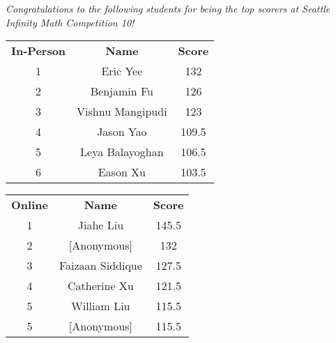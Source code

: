 \documentclass{article}
\date{\hspace{30mm}}
\begin{document}
\maketitle
\begin{minipage}[t]{.45\textwidth}\thispagestyle{empty}
  \vspace{-11mm}
  \tableofcontents
\end{minipage}%
\begin{minipage}[t]{.1\textwidth}\thispagestyle{empty}
  \;
\end{minipage}%
\begin{minipage}[t]{.45\textwidth}\thispagestyle{empty}
  \footnotesize
  \setlength{\parskip}{5pt}
  \vspace{-7mm}
  {\itshape
  Congratulations to the following students for being the top scorers at Seattle Infinity Math Competition 10!
    \begin{center}
        \begin{tabular}{c c c}
        \hline
           \textbf{In-Person}   & \textbf{Name} & \textbf{Score} \\
           1 & Eric Yee & 132  \\
           2 & Benjamin Fu & 126 \\
           3 & Vishnu Mangipudi & 123 \\
           4 & Jason Yao & 109.5 \\
           5 & Leya Balayoghan & 106.5 \\
           6 & Eason Xu & 103.5 \\
           \hline
        \end{tabular}
    \end{center}
    
    \begin{center}
        \begin{tabular}{c c c}
        \hline
          \textbf{Online}    & \textbf{Name} & \textbf{Score} \\
           1 & Jiahe Liu & 145.5  \\
           2 & [Anonymous] & 132 \\
           3 & Faizaan Siddique & 127.5 \\
           4 & Catherine Xu & 121.5 \\
           5 & William Liu & 115.5 \\
           5 & [Anonymous] & 115.5 \\
           \hline
        \end{tabular}
    \end{center}
}
\end{minipage}
\end{document}
